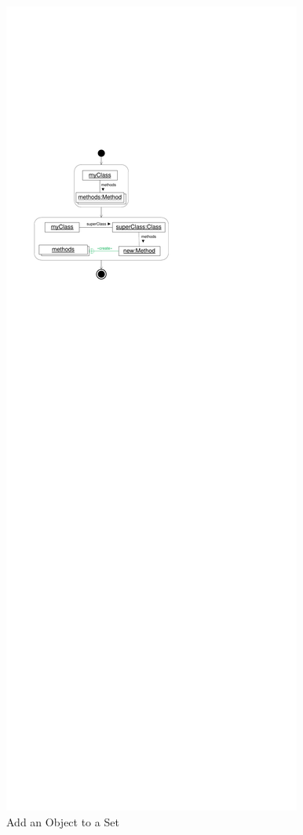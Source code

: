 \begin{figure}[htb]
\begin{minipage}{.47\textwidth}
		\includegraphics[width=\linewidth]{figures/InclusionLinksExample1}
    \caption{Add an Object to a Set}
    \label{fig:InclusionLinksExample1}
	\end{minipage}
\end{figure}

